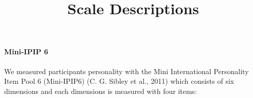 \documentclass[
  letterpaper,
  DIV=11,
  numbers=noendperiod]{scrartcl}
\title{Scale Descriptions}
\author{}
\date{}
\let\oldparagraph\paragraph
\renewcommand{\paragraph}[1]{\oldparagraph{#1}\mbox{}}
\begin{document}
\maketitle
\ifdefined\Shaded\renewenvironment{Shaded}{\begin{tcolorbox}[enhanced, interior hidden, boxrule=0pt, breakable, frame hidden, sharp corners, borderline west={3pt}{0pt}{shadecolor}]}{\end{tcolorbox}}\fi

\hypertarget{mini-ipip-6}{%
\paragraph{Mini-IPIP 6}\label{mini-ipip-6}}

We measured participants personality with the Mini International
Personality Item Pool 6 (Mini-IPIP6) (C. G. Sibley et al., 2011) which
consists of six dimensions and each dimensions is measured with four
items:
\end{document}
